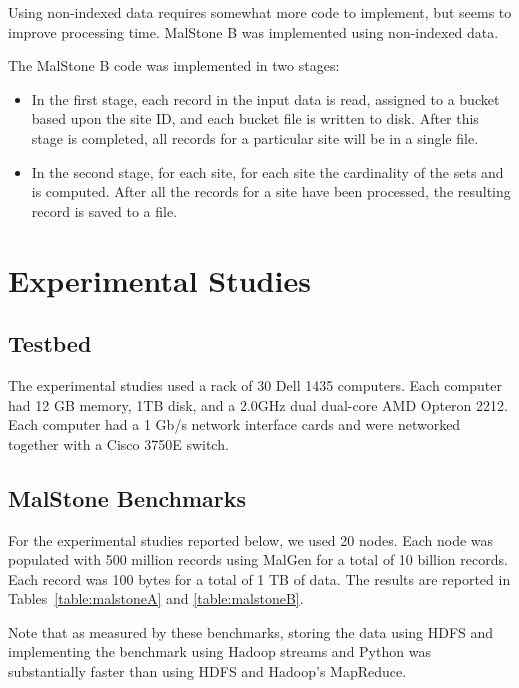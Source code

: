 \documentclass{acm_proc_article-sp}
\def\malstone{MalStone } \def\malgen{MalGen }
\begin{document}
Using non-indexed data requires somewhat more code to implement, but
seems to improve processing time.  \malstone B was implemented using
non-indexed data.

The \malstone B code was implemented in two stages:

\begin{itemize}

\item In the first stage, each record in the input data is read, assigned to a bucket based upon the site ID, and each bucket file is written to disk.  After this stage is completed, all records for a particular site will be in a single file.

\item In the second stage, for each site, for each site  the cardinality of the sets  and  is computed.  After all the records for a site  have been processed, the resulting record is saved to a file.

\end{itemize}

\section{Experimental Studies}
\label{section:experiments}

\subsection{Testbed}


The experimental studies used a rack of 30 Dell 1435 computers.
Each computer had 12 GB memory, 1TB disk, and a 
2.0GHz dual dual-core AMD Opteron 2212.  Each computer 
had a 1 Gb/s network interface cards and were networked together
with a Cisco 3750E switch.



\subsection{\malstone Benchmarks}

For the experimental studies reported below, we used 20 nodes. Each
node was populated with 500 million records using \malgen for a total
of 10 billion records.  Each record was 100 bytes for a total of 1 TB
of data.  The results are reported in Tables~\ref{table:malstoneA} and
\ref{table:malstoneB}.

Note that as measured by these benchmarks, storing the data using HDFS and 
implementing the benchmark using Hadoop streams and Python was substantially
faster than using HDFS and Hadoop's MapReduce.
\end{document}
